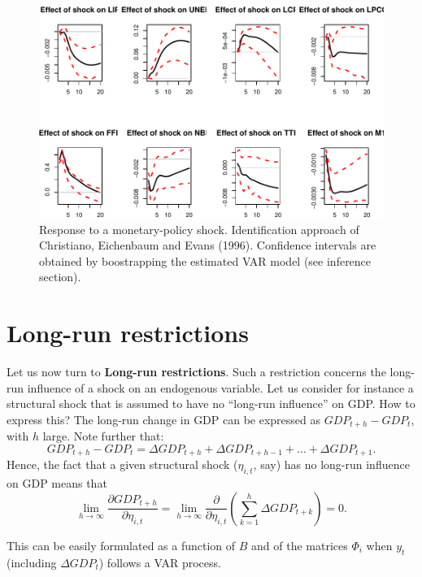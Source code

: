 \documentclass[
  12pt,
]{book}
\theoremstyle{definition}
\theoremstyle{definition}
\theoremstyle{definition}
\theoremstyle{definition}
\theoremstyle{remark}
\begin{document}
\begin{figure}
\includegraphics[width=0.95\linewidth]{IdentifStructShocks_files/figure-latex/CEE-1} \caption{Response to a monetary-policy shock. Identification approach of Christiano, Eichenbaum and Evans (1996). Confidence intervals are obtained by boostrapping the estimated VAR model (see inference section).}\label{fig:CEE}
\end{figure}

\hypertarget{long-run-restrictions}{%
\section{Long-run restrictions}\label{long-run-restrictions}}

Let us now turn to \textbf{Long-run restrictions}. Such a restriction concerns the long-run influence of a shock on an endogenous variable. Let us consider for instance a structural shock that is assumed to have no ``long-run influence'' on GDP. How to express this? The long-run change in GDP can be expressed as \(GDP_{t+h} - GDP_t\), with \(h\) large. Note further that:
\[
GDP_{t+h} - GDP_t = \Delta GDP_{t+h} +\Delta GDP_{t+h-1} + \dots + \Delta GDP_{t+1}.
\]
Hence, the fact that a given structural shock (\(\eta_{i,t}\), say) has no long-run influence on GDP means that
\[
\lim_{h\rightarrow\infty}\frac{\partial GDP_{t+h}}{\partial \eta_{i,t}} = \lim_{h\rightarrow\infty} \frac{\partial}{\partial \eta_{i,t}}\left(\sum_{k=1}^h \Delta  GDP_{t+k}\right)= 0.
\]

This can be easily formulated as a function of \(B\) and of the matrices \(\Phi_i\) when \(y_t\) (including \(\Delta GDP_t\)) follows a VAR process.
\end{document}
